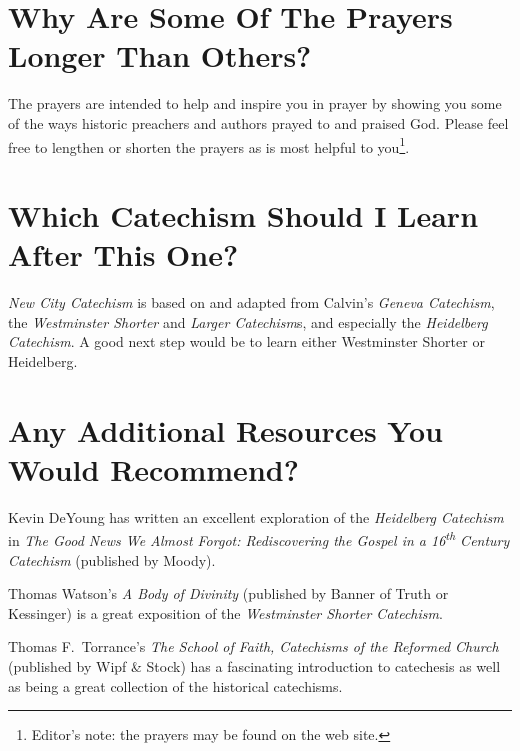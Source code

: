 \documentclass[titlepage]{memoir}
\begin{document}
\section[Why Are Some Of The Prayers Longer Than Others?][Why Are Some Prayers Longer?]{Why Are Some Of The Prayers Longer Than Others?}

The prayers are intended to help and inspire you in prayer by showing you some of the ways historic preachers and authors prayed to and praised God. Please feel free to lengthen or shorten the prayers as is most helpful to you\footnote{Editor's note: the prayers may be found on the web site.}.

\section[Which Catechism Should I Learn After This One?][Next Catechism After This One?]{Which Catechism Should I Learn After This One?}

\emph{New City Catechism}\/ is based on and adapted from Calvin's {\em Geneva Catechism}, the {\em Westminster Shorter}\/ and {\em Larger Catechism}s, and especially the {\em Heidelberg Catechism}. A good next step would be to learn either Westminster Shorter or Heidelberg.

\section[Any Additional Resources You Would Recommend?][Additional Resources?]{Any Additional Resources You Would Recommend?}

Kevin DeYoung has written an excellent exploration of the \emph{Heidelberg Catechism}\/ in \emph{The Good News We Almost Forgot: Rediscovering the Gospel\/ in a 16\textsuperscript{th} Century Catechism}\/ (published by Moody).

Thomas Watson's \emph{A Body of Divinity}\/ (published by Banner of Truth or Kessinger) is a great exposition of the \emph{Westminster Shorter Catechism}.

Thomas F.\ Torrance's \emph{The School of Faith, Catechisms of the Reformed Church}\/ (published by Wipf \& Stock) has a fascinating introduction to catechesis as well as being a great collection of the historical catechisms.
\end{document}
